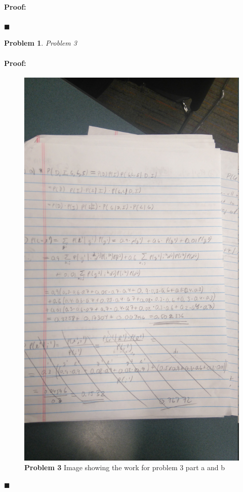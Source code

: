 \documentclass[12pt]{article}
\newenvironment{proof}{\paragraph{Proof: }}{\hfill$\blacksquare$}
\newtheorem{problem}{Problem}%
\begin{document}
\begin{proof}



\end{proof}

\newpage
\begin{problem}
\normalfont 
Problem 3
\end{problem}

\begin{proof}

\begin{figure}[!htbp]
\centering
\includegraphics[width = 13cm]{hw6_3ab.jpg}
\caption{\textbf{Problem 3} Image showing the work for problem 3 part a and b}
\end{figure}


\end{proof}
\end{document}
